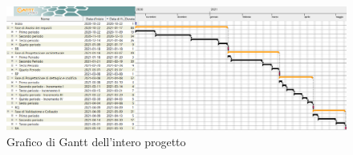 \begin{landscape}
	\begin{figure}[H]
		\centering
		\includegraphics[width=\linewidth]{res/images/ganttTotale.png}
		\caption{Grafico di Gantt dell'intero progetto}
		\label{fig:Gantt Analisi dei requisiti}
	\end{figure}
\end{landscape}

